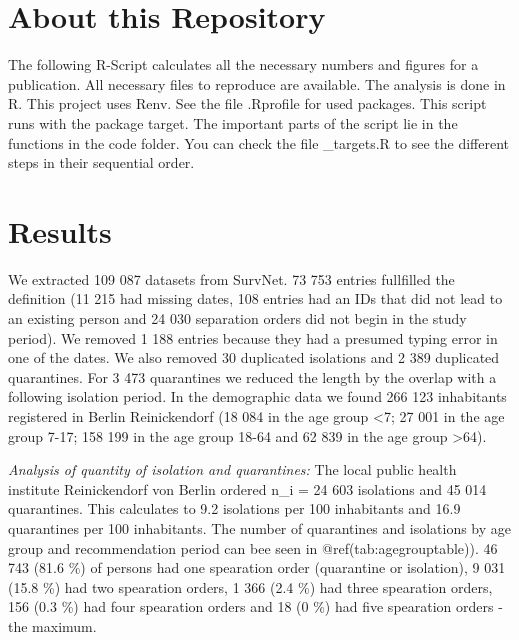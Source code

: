\documentclass[
]{article}
\newenvironment{Shaded}{\begin{snugshade}}{\end{snugshade}}
\newcommand{\FunctionTok}[1]{\textcolor[rgb]{0.00,0.00,0.00}{#1}}
\newcommand{\NormalTok}[1]{#1}
\newcommand{\OtherTok}[1]{\textcolor[rgb]{0.56,0.35,0.01}{#1}}
\newcommand{\SpecialCharTok}[1]{\textcolor[rgb]{0.00,0.00,0.00}{#1}}
\begin{document}
\hypertarget{about-this-repository}{%
\section{About this Repository}\label{about-this-repository}}

The following R-Script calculates all the necessary numbers and figures
for a publication. All necessary files to reproduce are available. The
analysis is done in R. This project uses Renv. See the file .Rprofile
for used packages. This script runs with the package target. The
important parts of the script lie in the functions in the code folder.
You can check the file \_targets.R to see the different steps in their
sequential order.

\hypertarget{results}{%
\section{Results}\label{results}}

\begin{Shaded}
\end{Shaded}

We extracted 109 087 datasets from SurvNet. 73 753 entries fullfilled
the definition (11 215 had missing dates, 108 entries had an IDs that
did not lead to an existing person and 24 030 separation orders did not
begin in the study period). We removed 1 188 entries because they had a
presumed typing error in one of the dates. We also removed 30 duplicated
isolations and 2 389 duplicated quarantines. For 3 473 quarantines we
reduced the length by the overlap with a following isolation period. In
the demographic data we found 266 123 inhabitants registered in Berlin
Reinickendorf (18 084 in the age group \textless7; 27 001 in the age
group 7-17; 158 199 in the age group 18-64 and 62 839 in the age group
\textgreater64).

\emph{Analysis of quantity of isolation and quarantines:} The local
public health institute Reinickendorf von Berlin ordered n\_i = 24 603
isolations and 45 014 quarantines. This calculates to 9.2 isolations per
100 inhabitants and 16.9 quarantines per 100 inhabitants. The number of
quarantines and isolations by age group and recommendation period can
bee seen in @ref(tab:agegrouptable)). 46 743 (81.6 \%) of persons had
one spearation order (quarantine or isolation), 9 031 (15.8 \%) had two
spearation orders, 1 366 (2.4 \%) had three spearation orders, 156 (0.3
\%) had four spearation orders and 18 (0 \%) had five spearation orders
- the maximum.
\end{document}
